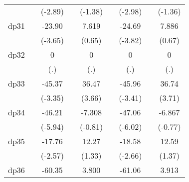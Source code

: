 {\begin{tabular}{l*{8}{c}}
            &                     &     (-2.89)         &                     &     (-1.38)         &                     &     (-2.98)         &                     &     (-1.36)         \\
[1em]
dp31        &                     &      -23.90\sym{***}&                     &       7.619         &                     &      -24.69\sym{***}&                     &       7.886         \\
            &                     &     (-3.65)         &                     &      (0.65)         &                     &     (-3.82)         &                     &      (0.67)         \\
[1em]
dp32        &                     &           0         &                     &           0         &                     &           0         &                     &           0         \\
            &                     &         (.)         &                     &         (.)         &                     &         (.)         &                     &         (.)         \\
[1em]
dp33        &                     &      -45.37\sym{***}&                     &       36.47\sym{***}&                     &      -45.96\sym{***}&                     &       36.74\sym{***}\\
            &                     &     (-3.35)         &                     &      (3.66)         &                     &     (-3.41)         &                     &      (3.71)         \\
[1em]
dp34        &                     &      -46.21\sym{***}&                     &      -7.308         &                     &      -47.06\sym{***}&                     &      -6.867         \\
            &                     &     (-5.94)         &                     &     (-0.81)         &                     &     (-6.02)         &                     &     (-0.77)         \\
[1em]
dp35        &                     &      -17.76\sym{*}  &                     &       12.27         &                     &      -18.58\sym{**} &                     &       12.59         \\
            &                     &     (-2.57)         &                     &      (1.33)         &                     &     (-2.66)         &                     &      (1.37)         \\
[1em]
dp36        &                     &      -60.35\sym{***}&                     &       3.800         &                     &      -61.06\sym{***}&                     &       3.913         \\

\end{tabular}}
